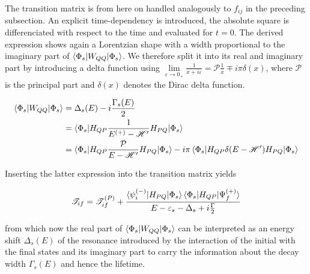 The transition matrix is from here on handled analogously to $f_{ij}$ in the preceding subsection.
An explicit time-dependency is introduced, the absolute square is differenciated
with respect to the time and evaluated for $t=0$.
The derived expression shows again a Lorentzian shape with a width proportional to
the imaginary part of $\braket{\Phi_s|W_{QQ}|\Phi_s}$. We therefore split it into
its real and imaginary part by introducing a delta function using 
$\lim\limits_{\varepsilon \to 0_+} \frac{1}{x+i\varepsilon} = \mathscr{P} \frac 1x \mp i\pi\delta(x)$,
where $\mathscr{P}$ is the principal part and $\delta(x)$ denotes the
Dirac delta function. \cite{Cohen_Tannoudji_3_2}

\begin{align}
  \braket{\Phi_s|W_{QQ}|\Phi_s} & = \Delta_s(E) - i \frac{\Gamma_s(E)}{2}\\
                                & = \braket{\Phi_s|H_{QP}
                                    \frac{1}{E^{(+)}  - \mathscr{H}'}H_{PQ}|\Phi_s}\\
                                & = \braket{\Phi_s|H_{QP}
                                    \frac{\mathcal{P}}{E - \mathscr{H}'}H_{PQ}|\Phi_s}
                                    - i\pi \braket{\Phi_s|H_{QP}\delta(E-\mathscr{H}')H_{PQ}
                                    |\Phi_s} 
\end{align}

Inserting the latter expression into the transition matrix yields

\begin{equation}
  \mathscr{T}_{if} = \mathscr{T}_{if}^{(P)} + 
                     \frac{\braket{\psi_i^{(-)}|H_{PQ}|\Phi_s}
                           \braket{\Phi_s|H_{QP}|\Psi_f^{(+)}}}
                          {E-\varepsilon_s - \Delta_s + i \frac{\Gamma}{2}}
\end{equation}

from which now the real part of $\braket{\Phi_s|W_{QQ}|\Phi_s}$ can be interpreted 
as an energy shift $\Delta_s(E)$ of the resonance introduced by the interaction of the initial
with the final states and its imaginary part to carry the information about the
decay width $\Gamma_s(E)$ and hence the lifetime.






